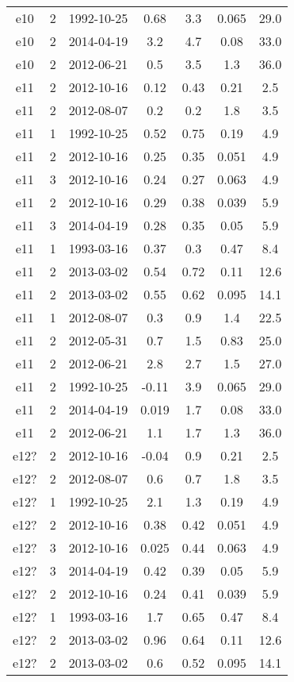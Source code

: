 \begin{table*}[htp]
\begin{tabular}{ccccccc}
e10 & 2 & 1992-10-25 & 0.68 & 3.3 & 0.065 & 29.0 \\
e10 & 2 & 2014-04-19 & 3.2 & 4.7 & 0.08 & 33.0 \\
e10 & 2 & 2012-06-21 & 0.5 & 3.5 & 1.3 & 36.0 \\
e11 & 2 & 2012-10-16 & 0.12 & 0.43 & 0.21 & 2.5 \\
e11 & 2 & 2012-08-07 & 0.2 & 0.2 & 1.8 & 3.5 \\
e11 & 1 & 1992-10-25 & 0.52 & 0.75 & 0.19 & 4.9 \\
e11 & 2 & 2012-10-16 & 0.25 & 0.35 & 0.051 & 4.9 \\
e11 & 3 & 2012-10-16 & 0.24 & 0.27 & 0.063 & 4.9 \\
e11 & 2 & 2012-10-16 & 0.29 & 0.38 & 0.039 & 5.9 \\
e11 & 3 & 2014-04-19 & 0.28 & 0.35 & 0.05 & 5.9 \\
e11 & 1 & 1993-03-16 & 0.37 & 0.3 & 0.47 & 8.4 \\
e11 & 2 & 2013-03-02 & 0.54 & 0.72 & 0.11 & 12.6 \\
e11 & 2 & 2013-03-02 & 0.55 & 0.62 & 0.095 & 14.1 \\
e11 & 1 & 2012-08-07 & 0.3 & 0.9 & 1.4 & 22.5 \\
e11 & 2 & 2012-05-31 & 0.7 & 1.5 & 0.83 & 25.0 \\
e11 & 2 & 2012-06-21 & 2.8 & 2.7 & 1.5 & 27.0 \\
e11 & 2 & 1992-10-25 & -0.11 & 3.9 & 0.065 & 29.0 \\
e11 & 2 & 2014-04-19 & 0.019 & 1.7 & 0.08 & 33.0 \\
e11 & 2 & 2012-06-21 & 1.1 & 1.7 & 1.3 & 36.0 \\
e12? & 2 & 2012-10-16 & -0.04 & 0.9 & 0.21 & 2.5 \\
e12? & 2 & 2012-08-07 & 0.6 & 0.7 & 1.8 & 3.5 \\
e12? & 1 & 1992-10-25 & 2.1 & 1.3 & 0.19 & 4.9 \\
e12? & 2 & 2012-10-16 & 0.38 & 0.42 & 0.051 & 4.9 \\
e12? & 3 & 2012-10-16 & 0.025 & 0.44 & 0.063 & 4.9 \\
e12? & 3 & 2014-04-19 & 0.42 & 0.39 & 0.05 & 5.9 \\
e12? & 2 & 2012-10-16 & 0.24 & 0.41 & 0.039 & 5.9 \\
e12? & 1 & 1993-03-16 & 1.7 & 0.65 & 0.47 & 8.4 \\
e12? & 2 & 2013-03-02 & 0.96 & 0.64 & 0.11 & 12.6 \\
e12? & 2 & 2013-03-02 & 0.6 & 0.52 & 0.095 & 14.1 \\

\end{tabular}
\end{table*}
